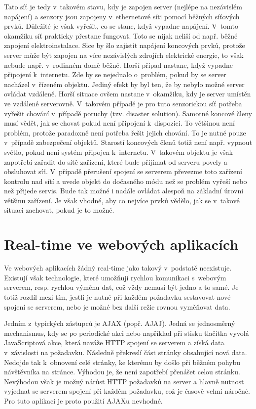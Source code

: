 Tato síť je tedy v~takovém stavu, kdy je zapojen server (nejlépe na nezávislém napájení) a senzory jsou zapojeny v~ethernetové síti pomocí běž\-ných síťových prvků. Důležité je však vyřešit, co se stane, když vypadne napájení. V~tomto okamžiku síť prakticky přestane fungovat. Toto se nijak neliší od např. běžné zapojení elektroinstalace. Sice by šlo zajistit napájení koncových prvků, protože server může být zapojen na více nezávislých zdro\-jích elektrické energie, to však nebude např. v~rodinném domě běžné. Horší případ nastane, když vypadne připojení k~internetu. Zde by se nejednalo o~problém, pokud by se server nacházel v~řízeném objektu. Jediný efekt by byl ten, že by nebylo možné server ovládat vzdáleně. Horší situace ovšem nastane v~okamžiku, kdy je server umístěn ve vzdálené serverovně. V~takovém případě je pro tuto senzorickou síť potřeba vyřešit chování v~případě poruchy (tzv. disaster solution). Samotné koncové členy musí vědět, jak se chovat pokud není připojení k~dispozici. To většinou není problém, protože paradoxně není potřeba řešit jejich chování. To je nutné pouze v~případě zabezpečení objektů. Starostí koncových členů totiž není např. vypnout světlo, pokud není systém připojen k~internetu. V~takovém objektu je však zapotřebí zařadit do sítě zařízení, které bude přijímat od serveru povely a obsluhovat síť. V~případě přerušení spojení se serverem převezme toto zařízení kontrolu nad sítí a uvede objekt do dočasného módu než se problém vyřeší nebo než přijede servis. Bude tak možné i nadále ovládat alespoň na základní úrovni většinu zařízení. Je však vhodné, aby co nejvíce prvků vědělo, jak se v~takové situaci zachovat, pokud je to možné.

\section{Real-time ve webových aplikacích}
Ve webových aplikacích žádný real-time  jako takový v~podstatě neexistuje. Existují však technologie, které umožňují rychlou komunikaci s~webovým serverem, resp. rychlou výměnu dat, což vždy nemusí být jedno a to samé. Je totiž rozdíl mezi tím, jestli je nutné při každém požadavku sestavovat nové spojení se serverem, nebo je možné bez další režie rovnou vyměňovat data.

Jedním z~typických zástupců je AJAX (popř. AJAJ). Jedná se jed\-no\-směr\-ný mechanismus, kdy se po periodické akci nebo například při stisku tlačítka vyvolá JavaScriptová akce, která naváže HTTP spojení se serverem a získá data v~závislosti na požadavku. Následně překreslí část stránky obsahující nová data. Nedojde tak k~obnovení celé stránky, ke kterému by došlo při běžném pohybu návštěvníka na stránce. Výhodou je, že není zapotřebí přenášet celou stránku. Nevýhodou však je možný nárůst HTTP požadavků na server a hlavně nutnost vyjednat se serverem spojení při každém po\-ža\-dav\-ku, což je časově velmi náročné. Pro tuto aplikaci je proto použití AJAXu nevhodné. 

